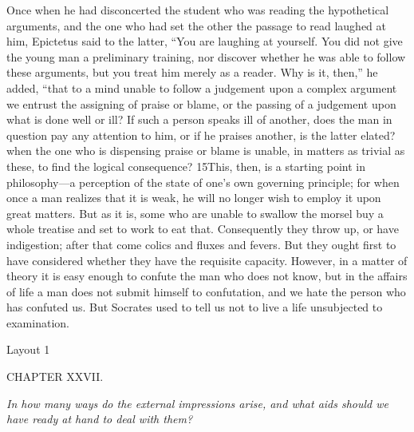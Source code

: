 Once when he had disconcerted the student who was reading the hypothetical arguments, and the one who had set the other the passage to read laughed at him, Epictetus said to the latter, ``You are laughing at yourself. You did not give the young man a preliminary training, nor discover whether he was able to follow these arguments, but you treat him merely as a reader. Why is it, then,'' he added, ``that to a mind unable to follow a judgement upon a complex argument we entrust the assigning of praise or blame, or the passing of a judgement upon what is done well or ill? If such a person speaks ill of another, does the man in question pay any attention to him, or if he praises another, is the latter elated? when the one who is dispensing praise or blame is unable, in matters as trivial as these, to find the logical consequence? 15This, then, is a starting point in philosophy—a perception of the state of one's own governing principle; for when once a man realizes that it is weak, he will no longer wish to employ it upon great matters. But as it is, some who are unable to swallow the morsel buy a whole treatise and set to work to eat that. Consequently they throw up, or have indigestion; after that come colics and fluxes and fevers. But they ought first to have considered whether they have the requisite capacity. However, in a matter of theory it is easy enough to confute the man who does not know, but in the affairs of life a man does not submit himself to confutation, and we hate the person who has confuted us. But Socrates used to tell us not to live a life unsubjected to examination.



Layout 1

CHAPTER XXVII.

\emph{In how many ways do the external impressions arise, and what aids should we have ready at hand to deal with them?}

